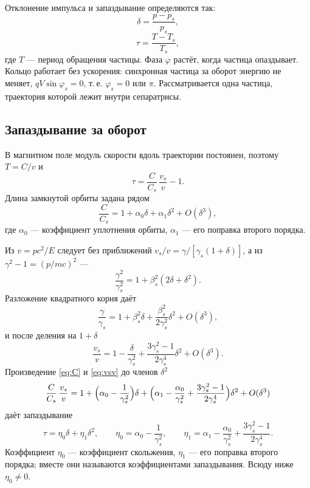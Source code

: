 Отклонение импульса и запаздывание определяются так:
\begin{equation}
\label{eq:delta-def}
\delta=\frac{p-p_s}{p_s},
\end{equation}
\begin{equation}
\label{eq:tau-def}
\tau=\frac{T-T_s}{T_s},
\end{equation}
где $T$ --- период обращения частицы. Фаза $\varphi$ растёт, когда частица опаздывает. Кольцо работает без ускорения: синхронная частица за оборот энергию не меняет, $qV\sin\varphi_s=0$, т.\,е. $\varphi_s=0$ или $\pi$. Рассматривается одна частица, траектория которой лежит внутри сепаратрисы.

\subsection{Запаздывание за оборот}

В магнитном поле модуль скорости вдоль траектории постоянен, поэтому $T=C/v$ и
\begin{equation}
\label{eq:T-ratio}
\tau=\frac{C}{C_s}\,\frac{v_s}{v}-1.
\end{equation}
Длина замкнутой орбиты задана рядом
\begin{equation}
\label{eq:C}
\frac{C}{C_s}=1+\alpha_0\delta+\alpha_1\delta^2+O(\delta^3),
\end{equation}
где $\alpha_0$ --- коэффициент уплотнения орбиты, $\alpha_1$ --- его поправка второго порядка.

Из $v=pc^2/E$ следует без приближений $v_s/v=\gamma/[\gamma_s(1+\delta)]$, а из $\gamma^2-1=(p/mc)^2$ ---
\begin{equation}
\label{eq:gamma-exact}
\frac{\gamma^2}{\gamma_s^2}=1+\beta_s^2(2\delta+\delta^2).
\end{equation}
Разложение квадратного корня даёт
\begin{equation}
\label{eq:gamma-over}
\frac{\gamma}{\gamma_s}
=1+\beta_s^2\delta+\frac{\beta_s^2}{2\gamma_s^2}\delta^2+O(\delta^3),
\end{equation}
и после деления на $1+\delta$
\begin{equation}
\label{eq:vsv}
\frac{v_s}{v}
=1-\frac{\delta}{\gamma_s^2}+\frac{3\gamma_s^2-1}{2\gamma_s^4}\delta^2+O(\delta^3).
\end{equation}
Произведение \eqref{eq:C} и \eqref{eq:vsv} до членов $\delta^2$
\begin{equation}
\label{eq:tau-prod}
\frac{C}{C_s}\,\frac{v_s}{v}
=1+\Bigl(\alpha_0-\frac{1}{\gamma_s^2}\Bigr)\delta
+\Bigl(\alpha_1-\frac{\alpha_0}{\gamma_s^2}+\frac{3\gamma_s^2-1}{2\gamma_s^4}\Bigr)\delta^2
+O(\delta^3)
\end{equation}
даёт запаздывание
\begin{equation}
\label{eq:tau}
\tau=\eta_0\delta+\eta_1\delta^2,
\qquad
\eta_0=\alpha_0-\frac{1}{\gamma_s^2},
\qquad
\eta_1=\alpha_1-\frac{\alpha_0}{\gamma_s^2}+\frac{3\gamma_s^2-1}{2\gamma_s^4}.
\end{equation}
Коэффициент $\eta_0$ --- коэффициент скольжения, $\eta_1$ --- его поправка второго порядка; вместе они называются коэффициентами запаздывания. Всюду ниже $\eta_0\neq 0$.

